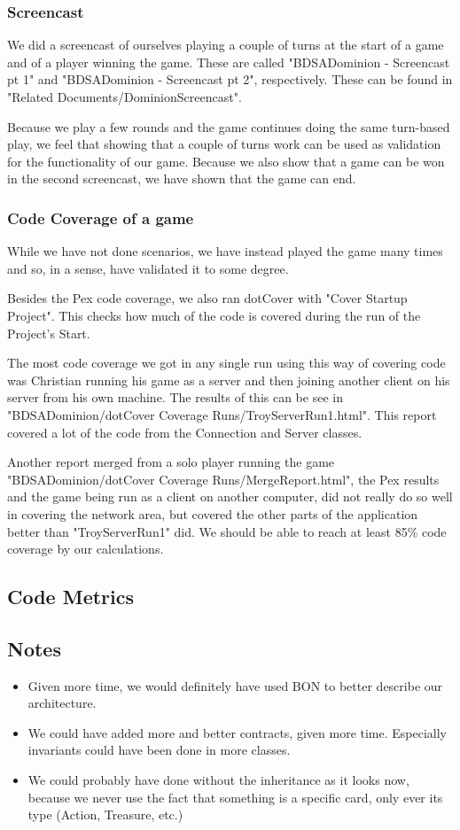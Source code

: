 \documentclass[12pt,a4paper,notitlepage]{article}
\begin{document}
\subsubsection{Screencast}
We did a screencast of ourselves playing a couple of turns at the start of a game and of a player winning the game. These are called "BDSADominion - Screencast pt 1" and "BDSADominion - Screencast pt 2", respectively. These can be found in "Related Documents/DominionScreencast".

Because we play a few rounds and the game continues doing the same turn-based play, we feel that showing that a couple of turns work can be used as validation for the functionality of our game. Because we also show that a game can be won in the second screencast, we have shown that the game can end.

\subsubsection{Code Coverage of a game}
While we have not done scenarios, we have instead played the game many times and so, in a sense, have validated it to some degree.

Besides the Pex code coverage, we also ran dotCover with "Cover Startup Project". This checks how much of the code is covered during the run of the Project's Start. 

The most code coverage we got in any single run using this way of covering code was Christian running his game as a server and then joining another client on his server from his own machine. The results of this can be see in "BDSADominion/dotCover Coverage Runs/TroyServerRun1.html". This report covered a lot of the code from the Connection and Server classes. 

Another report merged from a solo player running the game "BDSADominion/dotCover Coverage Runs/Merge\textunderscore Report.html", the Pex results and the game being run as a client on another computer, did not really do so well in covering the network area, but covered the other parts of the application better than "TroyServerRun1" did. We should be able to reach at least 85\% code coverage by our calculations.

\subsection{Code Metrics}

\subsection{Notes}
\begin{itemize}
\item Given more time, we would definitely have used BON to better describe our architecture.
\item We could have added more and better contracts, given more time. Especially invariants could have been done in more classes.
\item We could probably have done without the inheritance as it looks now, because we never use the fact that something is a specific card, only ever its type (Action, Treasure, etc.)
\end{itemize}
\end{document}

